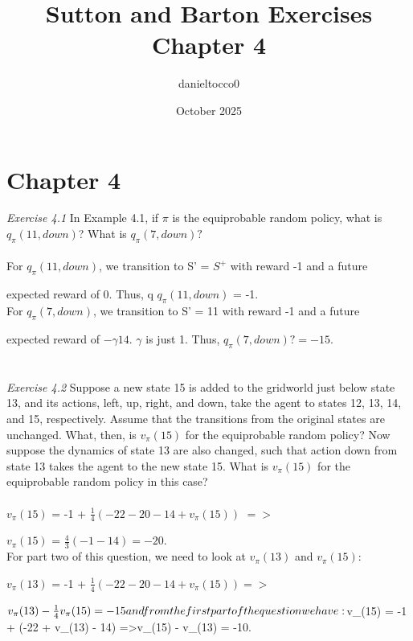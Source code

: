 \documentclass{article}
\title{Sutton and Barton Exercises Chapter 4}
\author{danieltocco0 }
\date{October 2025}
\begin{document}
\section{Chapter 4}
\textit{Exercise 4.1} In Example 4.1, if $\pi$ is the equiprobable random policy, what is $q_{\pi}(11 , down )$?
What is $q_{\pi}(7, down)?$ \\
\\

For $q_{\pi}(11 , down )$, we transition to S' = $S^{+}$ with reward -1 and a future 

expected reward of 0. Thus, q $q_{\pi}(11 , down )$ = -1.\\

For $q_{\pi}(7, down)$, we transition to S' = 11 with reward -1 and a future

expected reward of $-\gamma14$. $\gamma$ is just 1. Thus, $q_{\pi}(7, down)? = -15.$ \\
\\\\
\textit{Exercise 4.2} Suppose a new state 15 is added to the gridworld just below
state 13, and its actions, left, up, right, and down, take the agent to states 12, 13, 14,
and 15, respectively. Assume that the transitions from the original states are unchanged.
What, then, is $v_{\pi}(15)$ for the equiprobable random policy? Now suppose the dynamics of
state 13 are also changed, such that action down from state 13 takes the agent to the new
state 15. What is $v_{\pi}(15)$ for the equiprobable random policy in this case?\\
\\

$v_{\pi}(15)$ = -1 + $\frac{1}{4}(-22 - 20 - 14 + v_{\pi}(15))$ $=>$

$v_{\pi}(15)$ = $\frac{4}{3}(-1 - 14) = -20$. \\

For part two of this question, we need to look at $v_{\pi}(13)$ and $v_{\pi}(15)$: 

$v_{\pi}(13)$ = -1 + $\frac{1}{4}(-22 - 20 - 14 + v_{\pi}(15)) =>$

$v_{\pi}(13) - \frac{1}{4}v_{\pi}(15) = -15\\

and from the first part of the question we have:

$v_{\pi}(15) = -1 + (-22 + v_{\pi}(13) - 14) =>$

$v_{\pi}(15) - v_{\pi}(13) = -10.\\
\end{document}
